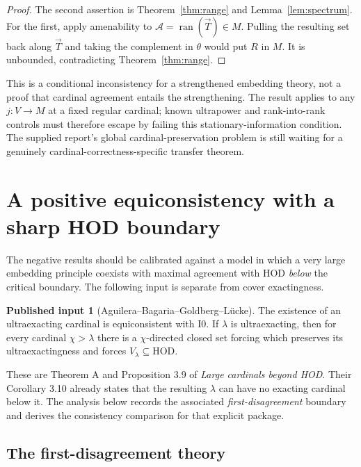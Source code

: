 \documentclass[11pt,letterpaper]{article}
\theoremstyle{definition}
\newcommand{\HOD}{\mathrm{HOD}}
\newcommand{\Izero}{\mathrm{I0}}
\newcommand{\ran}{\operatorname{ran}}
\newtheorem{inputtheorem}[definition]{Published input}
\theoremstyle{remark}
\begin{document}
\begin{proof}
The second assertion is Theorem~\ref{thm:range} and Lemma~\ref{lem:spectrum}. For the first, apply amenability to $\mathcal A=\ran(\vec T)\in M$. Pulling the resulting set back along $\vec T$ and taking the complement in $\theta$ would put $R$ in $M$. It is unbounded, contradicting Theorem~\ref{thm:range}.
\end{proof}

This is a conditional inconsistency for a strengthened embedding theory, not a proof that cardinal agreement entails the strengthening. The result applies to any $j:V\to M$ at a fixed regular cardinal; known ultrapower and rank-into-rank controls must therefore escape by failing this stationary-information condition. The supplied report's global cardinal-preservation problem is still waiting for a genuinely cardinal-correctness-specific transfer theorem.

\section{A positive equiconsistency with a sharp HOD boundary}\label{sec:positive}

The negative results should be calibrated against a model in which a very large embedding principle coexists with maximal agreement with HOD \emph{below} the critical boundary. The following input is separate from cover exactingness.

\begin{inputtheorem}[Aguilera--Bagaria--Goldberg--L\"ucke]\label{input:abgl}
The existence of an ultraexacting cardinal is equiconsistent with $\Izero$. If $\lambda$ is ultraexacting, then for every cardinal $\chi>\lambda$ there is a $\chi$-directed closed set forcing which preserves its ultraexactingness and forces $V_\lambda\subseteq\HOD$.
\end{inputtheorem}

These are Theorem A and Proposition 3.9 of \emph{Large cardinals beyond HOD}. Their Corollary 3.10 already states that the resulting $\lambda$ can have no exacting cardinal below it. The analysis below records the associated \emph{first-disagreement} boundary and derives the consistency comparison for that explicit package.\cite{abgl}

\subsection{The first-disagreement theory}
\end{document}
